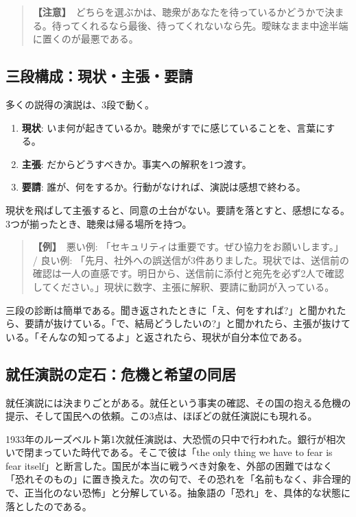 \documentclass{article}
\begin{document}
\begin{quote}
\textbf{【注意】}\ どちらを選ぶかは、聴衆があなたを待っているかどうかで決まる。待ってくれるなら最後、待ってくれないなら先。曖昧なまま中途半端に置くのが最悪である。
\end{quote}

\subsection{三段構成：現状・主張・要請}

多くの説得の演説は、3段で動く。

\begin{enumerate}
\item \textbf{現状}: いま何が起きているか。聴衆がすでに感じていることを、言葉にする。
\item \textbf{主張}: だからどうすべきか。事実への解釈を1つ渡す。
\item \textbf{要請}: 誰が、何をするか。行動がなければ、演説は感想で終わる。
\end{enumerate}

現状を飛ばして主張すると、同意の土台がない。要請を落とすと、感想になる。3つが揃ったとき、聴衆は帰る場所を持つ。

\begin{quote}
\textbf{【例】}\ 悪い例: 「セキュリティは重要です。ぜひ協力をお願いします。」 / 良い例: 「先月、社外への誤送信が3件ありました。現状では、送信前の確認は一人の直感です。明日から、送信前に添付と宛先を必ず2人で確認してください。」現状に数字、主張に解釈、要請に動詞が入っている。
\end{quote}

三段の診断は簡単である。聞き返されたときに「え、何をすれば?」と聞かれたら、要請が抜けている。「で、結局どうしたいの?」と聞かれたら、主張が抜けている。「そんなの知ってるよ」と返されたら、現状が自分本位である。

\subsection{就任演説の定石：危機と希望の同居}

就任演説には決まりごとがある。就任という事実の確認、その国の抱える危機の提示、そして国民への依頼。この3点は、ほぼどの就任演説にも現れる。

1933年のルーズベルト第1次就任演説は、大恐慌の只中で行われた。銀行が相次いで閉まっていた時代である。そこで彼は「the only thing we have to fear is fear itself」と断言した。国民が本当に戦うべき対象を、外部の困難ではなく「恐れそのもの」に置き換えた。次の句で、その恐れを「名前もなく、非合理的で、正当化のない恐怖」と分解している。抽象語の「恐れ」を、具体的な状態に落としたのである。
\end{document}
